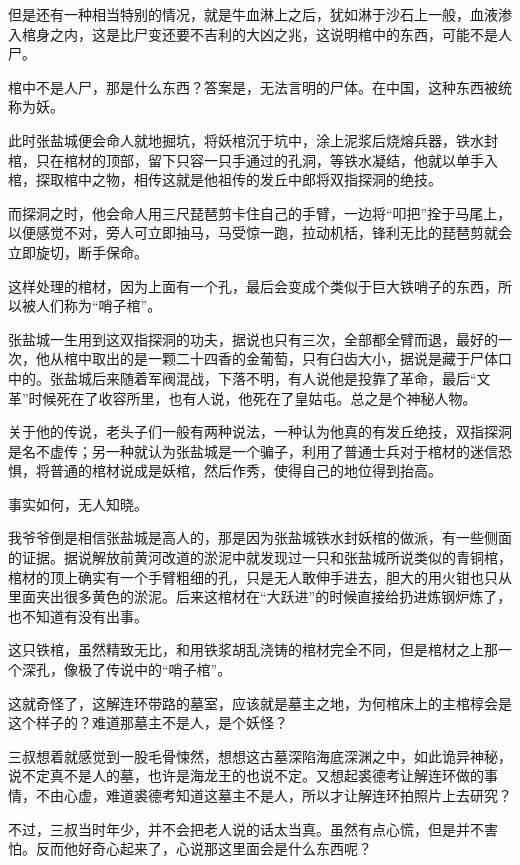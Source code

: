 但是还有一种相当特别的情况，就是牛血淋上之后，犹如淋于沙石上一般，血液渗入棺身之内，这是比尸变还要不吉利的大凶之兆，这说明棺中的东西，可能不是人尸。

棺中不是人尸，那是什么东西？答案是，无法言明的尸体。在中国，这种东西被统称为妖。

此时张盐城便会命人就地掘坑，将妖棺沉于坑中，涂上泥浆后烧熔兵器，铁水封棺，只在棺材的顶部，留下只容一只手通过的孔洞，等铁水凝结，他就以单手入棺，探取棺中之物，相传这就是他祖传的发丘中郎将双指探洞的绝技。

而探洞之时，他会命人用三尺琵琶剪卡住自己的手臂，一边将“叩把”拴于马尾上，以便感觉不对，旁人可立即抽马，马受惊一跑，拉动机栝，锋利无比的琵琶剪就会立即旋切，断手保命。

这样处理的棺材，因为上面有一个孔，最后会变成个类似于巨大铁哨子的东西，所以被人们称为“哨子棺”。

张盐城一生用到这双指探洞的功夫，据说也只有三次，全部都全臂而退，最好的一次，他从棺中取出的是一颗二十四香的金葡萄，只有臼齿大小，据说是藏于尸体口中的。张盐城后来随着军阀混战，下落不明，有人说他是投靠了革命，最后“文革”时候死在了收容所里，也有人说，他死在了皇姑屯。总之是个神秘人物。

关于他的传说，老头子们一般有两种说法，一种认为他真的有发丘绝技，双指探洞是名不虚传；另一种就认为张盐城是一个骗子，利用了普通士兵对于棺材的迷信恐惧，将普通的棺材说成是妖棺，然后作秀，使得自己的地位得到抬高。

事实如何，无人知晓。

我爷爷倒是相信张盐城是高人的，那是因为张盐城铁水封妖棺的做派，有一些侧面的证据。据说解放前黄河改道的淤泥中就发现过一只和张盐城所说类似的青铜棺，棺材的顶上确实有一个手臂粗细的孔，只是无人敢伸手进去，胆大的用火钳也只从里面夹出很多黄色的淤泥。后来这棺材在“大跃进”的时候直接给扔进炼钢炉炼了，也不知道有没有出事。

这只铁棺，虽然精致无比，和用铁浆胡乱浇铸的棺材完全不同，但是棺材之上那一个深孔，像极了传说中的“哨子棺”。

这就奇怪了，这解连环带路的墓室，应该就是墓主之地，为何棺床上的主棺椁会是这个样子的？难道那墓主不是人，是个妖怪？

三叔想着就感觉到一股毛骨悚然，想想这古墓深陷海底深渊之中，如此诡异神秘，说不定真不是人的墓，也许是海龙王的也说不定。又想起裘德考让解连环做的事情，不由心虚，难道裘德考知道这墓主不是人，所以才让解连环拍照片上去研究？

不过，三叔当时年少，并不会把老人说的话太当真。虽然有点心慌，但是并不害怕。反而他好奇心起来了，心说那这里面会是什么东西呢？

